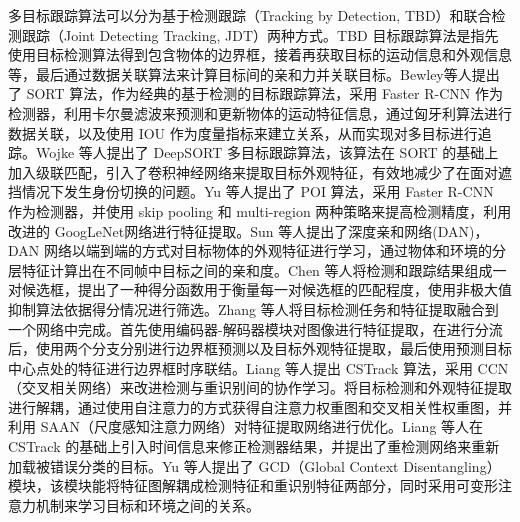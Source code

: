 多目标跟踪算法可以分为基于检测跟踪（Tracking by Detection, TBD）和联合检测跟踪（Joint Detecting Tracking, JDT）两种方式。TBD 目标跟踪算法是指先使用目标检测算法得到包含物体的边界框，接着再获取目标的运动信息和外观信息等，最后通过数据关联算法来计算目标间的亲和力并关联目标。Bewley等人\cite{bewley2016simple}提出了 SORT 算法，作为经典的基于检测的目标跟踪算法，采用 Faster R-CNN 作为检测器，利用卡尔曼滤波来预测和更新物体的运动特征信息，通过匈牙利算法进行数据关联，以及使用 IOU 作为度量指标来建立关系，从而实现对多目标进行追踪。Wojke 等人\cite{wojke2017simple}提出了 DeepSORT 多目标跟踪算法，该算法在 SORT 的基础上加入级联匹配，引入了卷积神经网络来提取目标外观特征，有效地减少了在面对遮挡情况下发生身份切换的问题。Yu 等人\cite{yu2016poi}提出了 POI 算法，采用 Faster R-CNN 作为检测器，并使用 skip pooling 和 multi-region 两种策略来提高检测精度，利用改进的 GoogLeNet\cite{szegedy2015going}网络进行特征提取。Sun 等人\cite{sun2019deep}提出了深度亲和网络(DAN)，DAN 网络以端到端的方式对目标物体的外观特征进行学习，通过物体和环境的分层特征计算出在不同帧中目标之间的亲和度。Chen 等人\cite{chen2018real}将检测和跟踪结果组成一对候选框，提出了一种得分函数用于衡量每一对候选框的匹配程度，使用非极大值抑制算法依据得分情况进行筛选。Zhang 等人\cite{zhang2021fairmot}将目标检测任务和特征提取融合到一个网络中完成。首先使用编码器-解码器模块对图像进行特征提取，在进行分流后，使用两个分支分别进行边界框预测以及目标外观特征提取，最后使用预测目标中心点处的特征进行边界框时序联结。Liang 等人\cite{liang2022rethinking}提出 CSTrack 算法，采用 CCN（交叉相关网络）来改进检测与重识别间的协作学习。将目标检测和外观特征提取进行解耦，通过使用自注意力的方式获得自注意力权重图和交叉相关性权重图，并利用 SAAN\cite{zhao2020saan}（尺度感知注意力网络）对特征提取网络进行优化。Liang 等人\cite{liang2022fake}在 CSTrack 的基础上引入时间信息来修正检测器结果，并提出了重检测网络来重新加载被错误分类的目标。Yu 等人\cite{yu2022relationtrack}提出了 GCD（Global Context Disentangling）模块，该模块能将特征图解耦成检测特征和重识别特征两部分，同时采用可变形注意力机制来学习目标和环境之间的关系。

